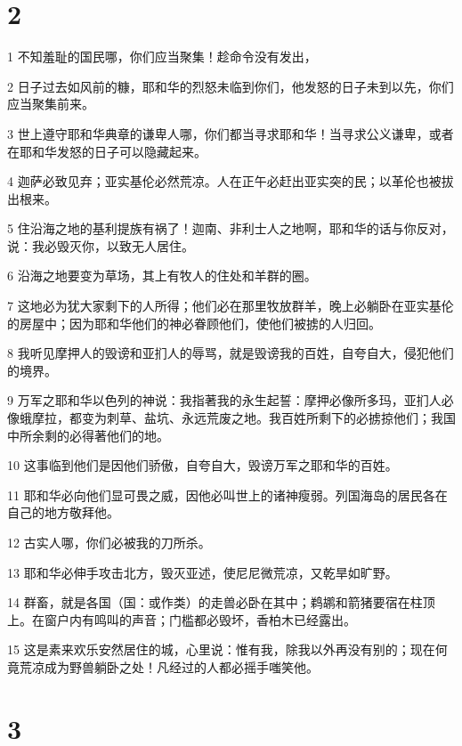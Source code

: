 \chapter{2}

\par 1 不知羞耻的国民哪，你们应当聚集！趁命令没有发出，
\par 2 日子过去如风前的糠，耶和华的烈怒未临到你们，他发怒的日子未到以先，你们应当聚集前来。
\par 3 世上遵守耶和华典章的谦卑人哪，你们都当寻求耶和华！当寻求公义谦卑，或者在耶和华发怒的日子可以隐藏起来。
\par 4 迦萨必致见弃；亚实基伦必然荒凉。人在正午必赶出亚实突的民；以革伦也被拔出根来。
\par 5 住沿海之地的基利提族有祸了！迦南、非利士人之地啊，耶和华的话与你反对，说：我必毁灭你，以致无人居住。
\par 6 沿海之地要变为草场，其上有牧人的住处和羊群的圈。
\par 7 这地必为犹大家剩下的人所得；他们必在那里牧放群羊，晚上必躺卧在亚实基伦的房屋中；因为耶和华他们的神必眷顾他们，使他们被掳的人归回。
\par 8 我听见摩押人的毁谤和亚扪人的辱骂，就是毁谤我的百姓，自夸自大，侵犯他们的境界。
\par 9 万军之耶和华以色列的神说：我指著我的永生起誓：摩押必像所多玛，亚扪人必像蛾摩拉，都变为刺草、盐坑、永远荒废之地。我百姓所剩下的必掳掠他们；我国中所余剩的必得著他们的地。
\par 10 这事临到他们是因他们骄傲，自夸自大，毁谤万军之耶和华的百姓。
\par 11 耶和华必向他们显可畏之威，因他必叫世上的诸神瘦弱。列国海岛的居民各在自己的地方敬拜他。
\par 12 古实人哪，你们必被我的刀所杀。
\par 13 耶和华必伸手攻击北方，毁灭亚述，使尼尼微荒凉，又乾旱如旷野。
\par 14 群畜，就是各国（国：或作类）的走兽必卧在其中；鹈鹕和箭猪要宿在柱顶上。在窗户内有鸣叫的声音；门槛都必毁坏，香柏木已经露出。
\par 15 这是素来欢乐安然居住的城，心里说：惟有我，除我以外再没有别的；现在何竟荒凉成为野兽躺卧之处！凡经过的人都必摇手嗤笑他。

\chapter{3}

